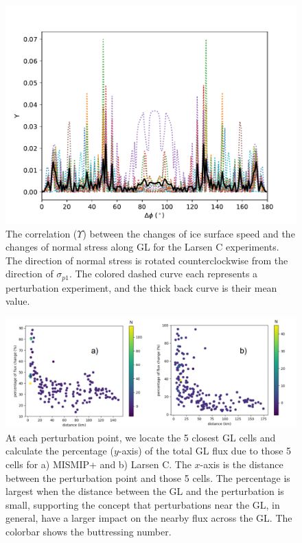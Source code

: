\documentclass[tc, manuscript]{copernicus}
\begin{document}
\begin{figure}
	\centering
	\includegraphics[width=1\linewidth]{figs/stress_vel_corr_GL_allP_larsenC.pdf}
	\caption{The correlation ($\Upsilon$) between the changes of ice surface speed and the changes of normal stress along GL for the Larsen C experiments. The direction of normal stress is rotated counterclockwise from the direction of $\sigma_{p1}$. The colored dashed curve each represents a perturbation experiment, and the thick back curve is their mean value.}
	\label{stress_vel_corr_GL_allP_larsenC}
\end{figure}

\begin{figure}
	\centering
	\includegraphics[width=1\linewidth]{figs/mismip_larsenc_dist.pdf}
	\caption{At each perturbation point, we locate the 5 closest GL cells and calculate the percentage ($y$-axis) of the total GL flux due to those 5 cells for a) MISMIP+ and b) Larsen C. The $x$-axis is the distance between the perturbation point and those 5 cells. The percentage is largest when the distance between the GL and the perturbation is small, supporting the concept that perturbations near the GL, in general, have a larger impact on the nearby flux across the GL. The colorbar shows the buttressing number.}
	\label{mismip_larsenc_dist}
\end{figure}
\end{document}
